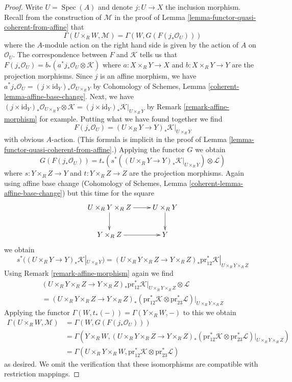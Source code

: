 \documentclass{stacks-project}
\theoremstyle{plain}
\theoremstyle{definition}
\theoremstyle{remark}
\numberwithin{equation}{subsection}
\def\Spec{\mathop{\mathrm{Spec}}}
\begin{document}
\begin{proof}
\medskip\noindent
Write $U = \Spec(A)$ and denote $j : U \to X$ the inclusion morphism.
Recall from the construction of $\mathcal{M}$ in the proof of
Lemma \ref{lemma-functor-quasi-coherent-from-affine} that
$$
\Gamma(U \times_R W, \mathcal{M}) =
\Gamma(W, G(F(j_*\mathcal{O}_U)))
$$
where the $A$-module action on the right hand side is given by
the action of $A$ on $\mathcal{O}_U$. The correspondence between
$F$ and $\mathcal{K}$ tells us that
$F(j_*\mathcal{O}_U) = b_*(a^*j_*\mathcal{O}_U \otimes \mathcal{K})$
where $a : X \times_R Y \to X$ and $b : X \times_R Y \to Y$ are
the projection morphisms. Since $j$ is an affine morphism, we have
$a^*j_*\mathcal{O}_U = (j \times \text{id}_Y)_*\mathcal{O}_{U \times_R Y}$
by Cohomology of Schemes, Lemma
\ref{coherent-lemma-affine-base-change}.
Next, we have
$(j \times \text{id}_Y)_*\mathcal{O}_{U \times_R Y} \otimes \mathcal{K} =
(j \times \text{id}_Y)_*\mathcal{K}|_{U \times_R Y}$
by Remark \ref{remark-affine-morphism} for example.
Putting what we have found together we find
$$
F(j_*\mathcal{O}_U) =
(U \times_R Y \to Y)_*\mathcal{K}|_{U \times_R Y}
$$
with obvious $A$-action. (This formula is implicit in the proof
of Lemma \ref{lemma-functor-quasi-coherent-from-affine}.)
Applying the functor $G$ we obtain
$$
G(F(j_*\mathcal{O}_U)) =
t_*(s^*((U \times_R Y \to Y)_*\mathcal{K}|_{U \times_R Y})
\otimes \mathcal{L})
$$
where $s : Y \times_R Z \to Y$ and $t : Y \times_R Z \to Z$ are
the projection morphisms. Again using affine base change
(Cohomology of Schemes, Lemma \ref{coherent-lemma-affine-base-change})
but this time for the square
$$
\xymatrix{
U \times_R Y \times_R Z \ar[r] \ar[d] & U \times_R Y \ar[d] \\
Y \times_R Z \ar[r] & Y
}
$$
we obtain
$$
s^*((U \times_R Y \to Y)_*\mathcal{K}|_{U \times_R Y}) =
(U \times_R Y \times_R Z \to Y \times_R Z)_*
\text{pr}_{12}^*\mathcal{K}|_{U \times_R Y \times_R Z}
$$
Using Remark \ref{remark-affine-morphism} again we find
\begin{align*}
(U \times_R Y \times_R Z \to Y \times_R Z)_*
\text{pr}_{12}^*\mathcal{K}|_{U \times_R Y \times_R Z}
\otimes \mathcal{L} \\
=
(U \times_R Y \times_R Z \to Y \times_R Z)_*
\left(\text{pr}_{12}^*\mathcal{K} \otimes
\text{pr}_{23}^*\mathcal{L}\right)|_{U \times_R Y \times_R Z}
\end{align*}
Applying the functor $\Gamma(W, t_*(-)) = \Gamma(Y \times_R W, -)$
to this we obtain
\begin{align*}
\Gamma(U \times_R W, \mathcal{M})
& =
\Gamma(W, G(F(j_*\mathcal{O}_U))) \\
& =
\Gamma(Y \times_R W, (U \times_R Y \times_R Z \to Y \times_R Z)_*
(\text{pr}_{12}^*\mathcal{K} \otimes
\text{pr}_{23}^*\mathcal{L})|_{U \times_R Y \times_R Z}) \\
& =
\Gamma(U \times_R Y \times_R W,
\text{pr}_{12}^*\mathcal{K} \otimes \text{pr}_{23}^*\mathcal{L})
\end{align*}
as desired. We omit the verification that these isomorphisms are
compatible with restriction mappings.
\end{proof}
\end{document}
